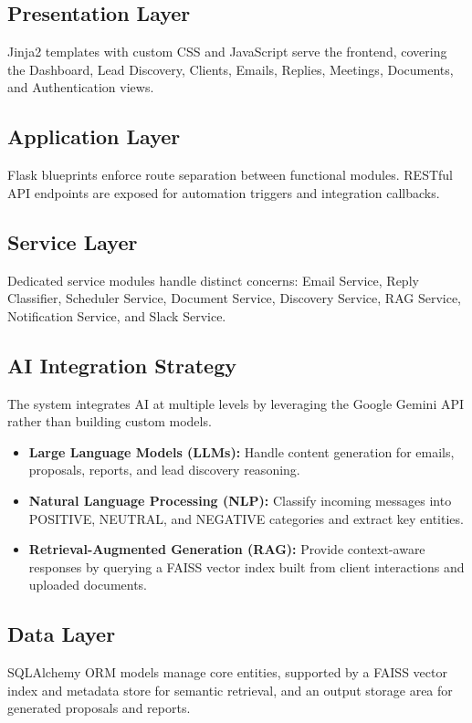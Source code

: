 \documentclass[12pt,a4paper]{report}
\begin{document}
\subsection{Presentation Layer}
Jinja2 templates with custom CSS and JavaScript serve the frontend, covering the Dashboard, Lead Discovery, Clients, Emails, Replies, Meetings, Documents, and Authentication views.

\subsection{Application Layer}
Flask blueprints enforce route separation between functional modules. RESTful API endpoints are exposed for automation triggers and integration callbacks.

\subsection{Service Layer}
Dedicated service modules handle distinct concerns: Email Service, Reply Classifier, Scheduler Service, Document Service, Discovery Service, RAG Service, Notification Service, and Slack Service.

\subsection{AI Integration Strategy}
The system integrates AI at multiple levels by leveraging the Google Gemini API rather than building custom models.

\begin{itemize}
    \item \textbf{Large Language Models (LLMs):} Handle content generation for emails, proposals, reports, and lead discovery reasoning.
    \item \textbf{Natural Language Processing (NLP):} Classify incoming messages into POSITIVE, NEUTRAL, and NEGATIVE categories and extract key entities.
    \item \textbf{Retrieval-Augmented Generation (RAG):} Provide context-aware responses by querying a FAISS vector index built from client interactions and uploaded documents.
\end{itemize}

\subsection{Data Layer}
SQLAlchemy ORM models manage core entities, supported by a FAISS vector index and metadata store for semantic retrieval, and an output storage area for generated proposals and reports.
\end{document}
